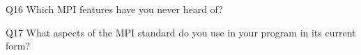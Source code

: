 \begin{description}%
\item{Q16} Which MPI features have you never heard of?%
\item{Q17} What aspects of the MPI standard do you use in your program in its current form?%
\end{description}%
